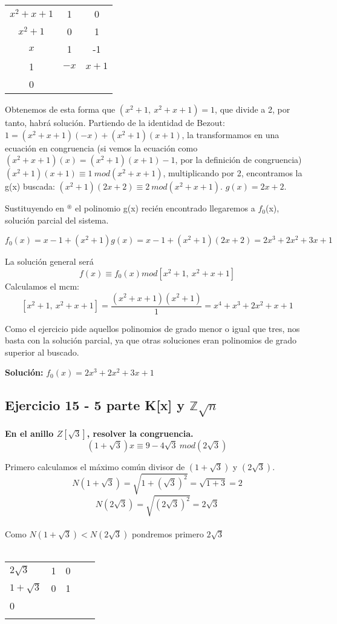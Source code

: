 \documentclass[11pt, a4paper, titlepage]{article}
\providecommand{\ent}{\mathbb{Z}}
\begin{document}
\begin{center}
\begin{tabular}{c|cc}
$x^2+x+1$ & 1 & 0 \\
$x^2+1$ & 0 & 1 \\
$x$ & 1 & -1 \\
1 & $-x$ & $x+1$\\
0
\end{tabular}
\end{center}

Obtenemos de esta forma que $(x^2+1,\ x^2+x+1) = 1$, que divide a 2, por tanto, habrá solución. Partiendo de la identidad de Bezout: $1 = (x^2+x+1)(-x) + (x^2+1)(x+1)$, la transformamos en una ecuación en congruencia (si vemos la ecuación como $(x^2+x+1)(x) = (x^2+1)(x+1) - 1$, por la definición de congruencia) $(x^2+1)(x+1) \equiv 1\ mod(x^2+x+1)$, multiplicando por 2, encontramos la g(x) buscada: $(x^2+1)(2x+2) \equiv 2\ mod(x^2+x+1)$.
$g(x)=2x+2$.

Sustituyendo en $^\circledast$ el polinomio g(x) recién encontrado llegaremos a $f_0$(x), solución parcial del sistema. 

$$f_0(x) = x-1 + (x^2+1)g(x) = x-1 + (x^2+1)(2x+2) = 2x^3+2x^2+3x+1$$

La solución general será $$f(x) \equiv f_0(x) mod[x^2+1,\ x^2+x+1]$$
Calculamos el mcm:
\[
	[x^2+1,\ x^2+x+1] = \frac{(x^2+x+1)(x^2+1)}{1} =x^4+x^3+2x^2+x+1
\]

Como el ejercicio pide aquellos polinomios de grado menor o igual que tres, nos basta con la solución parcial, ya que otras soluciones eran polinomios de grado superior al buscado.

\textbf{Solución:} $f_0(x) = 2x^3+2x^2+3x+1$


\subsection{\LARGE{Ejercicio 15 - 5 parte K[x] y $\ent\sqrt{n}$}}

\textbf{En el anillo $Z[\sqrt3]$, resolver la congruencia.
$$ (1+ \sqrt3)x \equiv 9 - 4\sqrt3 \ mod(2\sqrt3)$$}

Primero calculamos el máximo común divisor de $(1 + \sqrt 3)$ y $(2\sqrt3)$.\\
$$ N(1 + \sqrt3) = \sqrt{1 + {(\sqrt3)}^{2}} = \sqrt{1 + 3} = 2 $$
$$ N(2 \sqrt 3) = \sqrt{{(2\sqrt3)}^{2}} =  2\sqrt3 $$\\
Como $N(1 + \sqrt3) < N(2 \sqrt 3)$ pondremos primero $2 \sqrt3$\\ \\
\begin{tabular}{lllll}
\multicolumn{1}{l|}{$2\sqrt3$}    & 1 & 0 &  &  \\
\multicolumn{1}{l|}{$1 + \sqrt3$} & 0 & 1 &  &  \\
\multicolumn{1}{l|}{0} &   &   &  &  \\
                                &   &   &  & 
\end{tabular}
\end{document}
